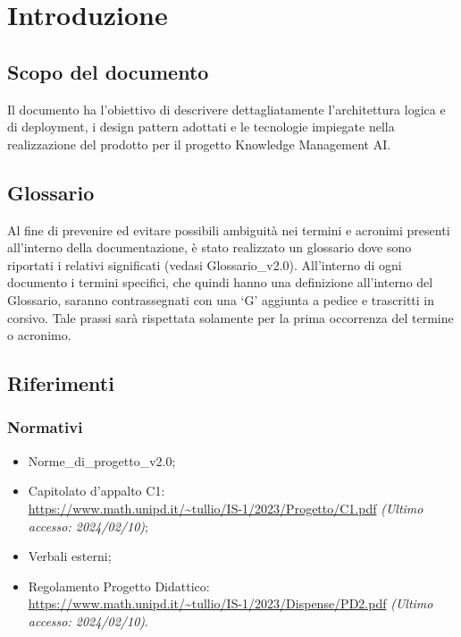 \chapter{Introduzione} \label{cap:intro}
\section{Scopo del documento}
Il documento ha l'obiettivo di descrivere dettagliatamente l'architettura logica e di deployment, i design pattern adottati e le tecnologie impiegate nella realizzazione del prodotto per il progetto Knowledge Management AI.
\section{Glossario}
Al fine di prevenire ed evitare possibili ambiguità nei termini e acronimi presenti all’interno della documentazione, è stato realizzato un glossario dove sono riportati i relativi significati (vedasi Glossario\_v2.0). All’interno di ogni documento i termini specifici, che quindi hanno una definizione all’interno del Glossario, saranno contrassegnati con una ‘G’ aggiunta a pedice e trascritti in corsivo. Tale prassi sarà rispettata solamente per la prima occorrenza del termine o acronimo.
\section{Riferimenti}
\subsection{Normativi}
\begin{itemize}
    \item Norme\_di\_progetto\_v2.0;
    \item Capitolato d'appalto C1: \\ \url{https://www.math.unipd.it/~tullio/IS-1/2023/Progetto/C1.pdf} \textit{(Ultimo accesso: 2024/02/10)};
    \item Verbali esterni;
    \item Regolamento Progetto Didattico: \\
    \url{https://www.math.unipd.it/~tullio/IS-1/2023/Dispense/PD2.pdf} \textit{(Ultimo accesso: 2024/02/10)}.
\end{itemize}

